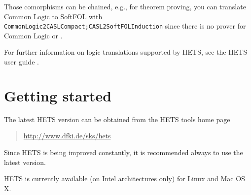 \documentclass{article}
\newcommand{\normalTEXTSC}[2]{{#1\scriptsize#2}}
\newcommand     {\Hets}{\normalTEXTSC{H}{ETS}\xspace}
\begin{document}
Those comorphisms can be chained, e.g., for theorem proving, you can translate 
Common Logic to SoftFOL with \texttt{CommonLogic2CASLCompact;CASL2SoftFOLInduction} 
since there is no prover for Common Logic or \CASL.

For further information on logic translations supported by \Hets, see the \Hets 
user guide \cite{HetsUserGuide}.

\section{Getting started}

The latest \Hets version can be obtained from the
\Hets tools home page
\begin{quote}
\url{http://www.dfki.de/sks/hets}
\end{quote}
 Since \Hets is being
improved constantly, it is recommended always to use the latest version.

\Hets is currently available (on Intel architectures only) for Linux
and Mac OS X.
\end{document}
